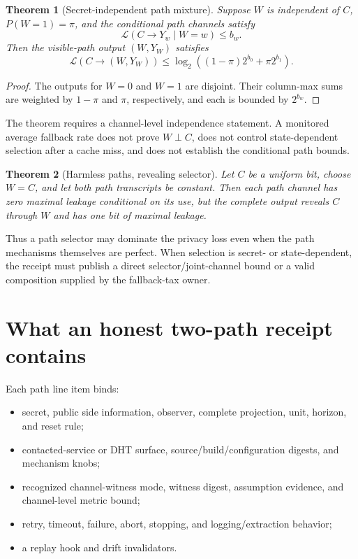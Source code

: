 \documentclass[11pt]{article}
\newtheorem{theorem}{Theorem}
\newcommand{\MaxL}{\mathcal{L}}
\begin{document}
\begin{theorem}[Secret-independent path mixture]\label{thm:mixture}
Suppose \(W\) is independent of \(C\), \(P(W=1)=\pi\), and the conditional path channels satisfy
\[
\MaxL(C\to Y_w\mid W=w)\le b_w.
\]
Then the visible-path output \((W,Y_W)\) satisfies
\[
\MaxL(C\to(W,Y_W))
\le\log_2\!\left((1-\pi)2^{b_0}+\pi2^{b_1}\right).
\]
\end{theorem}
\begin{proof}
The outputs for \(W=0\) and \(W=1\) are disjoint. Their column-max sums are weighted by \(1-\pi\) and \(\pi\), respectively, and each is bounded by \(2^{b_w}\).
\end{proof}

The theorem requires a channel-level independence statement. A monitored average fallback rate does not prove \(W\perp C\), does not control state-dependent selection after a cache miss, and does not establish the conditional path bounds.

\begin{theorem}[Harmless paths, revealing selector]\label{thm:selectorleak}
Let \(C\) be a uniform bit, choose \(W=C\), and let both path transcripts be constant. Then each path channel has zero maximal leakage conditional on its use, but the complete output reveals \(C\) through \(W\) and has one bit of maximal leakage.
\end{theorem}

Thus a path selector may dominate the privacy loss even when the path mechanisms themselves are perfect. When selection is secret- or state-dependent, the receipt must publish a direct selector/joint-channel bound or a valid composition supplied by the fallback-tax owner.\cite{series:fallbacktax}

\section{What an honest two-path receipt contains}\label{sec:receipt}
Each path line item binds:
\begin{itemize}[leftmargin=*]
\item secret, public side information, observer, complete projection, unit, horizon, and reset rule;
\item contacted-service or DHT surface, source/build/configuration digests, and mechanism knobs;
\item recognized channel-witness mode, witness digest, assumption evidence, and channel-level metric bound;
\item retry, timeout, failure, abort, stopping, and logging/extraction behavior;
\item a replay hook and drift invalidators.
\end{itemize}
\end{document}
